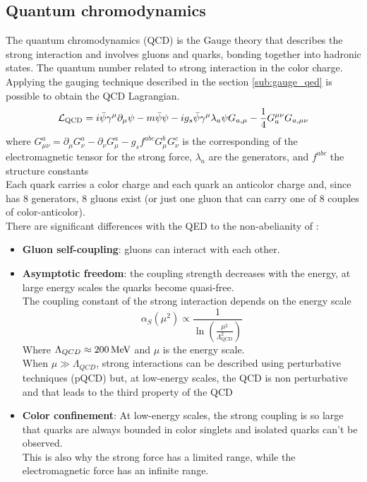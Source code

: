 \subsection{Quantum chromodynamics}\label{sub:QCD}
The quantum chromodynamics (QCD) is the  Gauge theory that describes the strong interaction and involves gluons and quarks, bonding together into hadronic states.
The quantum number related to strong interaction in the color charge.
Applying the gauging technique described in the section \ref{sub:gauge_qed} is possible to obtain the QCD Lagrangian.
\begin{equation}\label{eq:QCD}
    \mathcal{L}_\text{QCD}=i\bar{\psi}\gamma^{\mu}\partial_{\mu}\psi-m\bar{\psi}\psi-i g_{s}\bar{\psi}\gamma^{\mu}\lambda_{a}\psi G_{a,\mu}-\frac{1}{4}G_{a}^{\mu\nu}G_{a,\mu\nu}
\end{equation}
where \(G_{\mu\nu}^{a}=\partial_{\mu}G_{\nu}^{a}-\partial_{\nu}G_{\mu}^{a}-g_{s}f^{a b c}G_{\mu}^{b}G_{\nu}^{c}\) is the corresponding of the electromagnetic tensor for the strong force, $\lambda_a$ are the  generators, and $f^{abc}$ the  structure constants\\
Each quark carries a color charge and each quark an anticolor charge and, since  has 8 generators, 8 gluons exist (or just one gluon that can carry one of 8 couples of color-anticolor).\\
There are significant differences with the QED to the non-abelianity of :
\begin{itemize}
    \item \textbf{Gluon self-coupling}: gluons can interact with each other.
    \item \textbf{Asymptotic freedom}: the coupling strength decreases with the energy, \ie at large energy scales the quarks become quasi-free.\\
    The coupling constant of the strong interaction depends on the energy scale \cite{Deur2016TheCoupling}
    \begin{equation}\label{eq:alphas_run}
        \alpha_S(\mu^2)\propto \frac{1}{\ln \left( \frac{\mu^2}{\Lambda_{\text{QCD}}^2}\right)}        
    \end{equation}
    Where $\Lambda_{QCD}\approx 200 {\,\text{Me\hspace{-.08em}V}}$ and $\mu$ is the energy scale.\\
    When $\mu \gg \Lambda_{QCD}$, strong interactions can be described using perturbative techniques (pQCD) but, at low-energy scales, the QCD is non perturbative and that leads to the third property of the QCD
    \item \textbf{Color confinement}: At low-energy scales, the strong coupling is so large that quarks are always bounded in color singlets and isolated quarks can't be observed.\\
    This is also why the strong force has a limited range, while the electromagnetic force has an infinite range.
\end{itemize}

